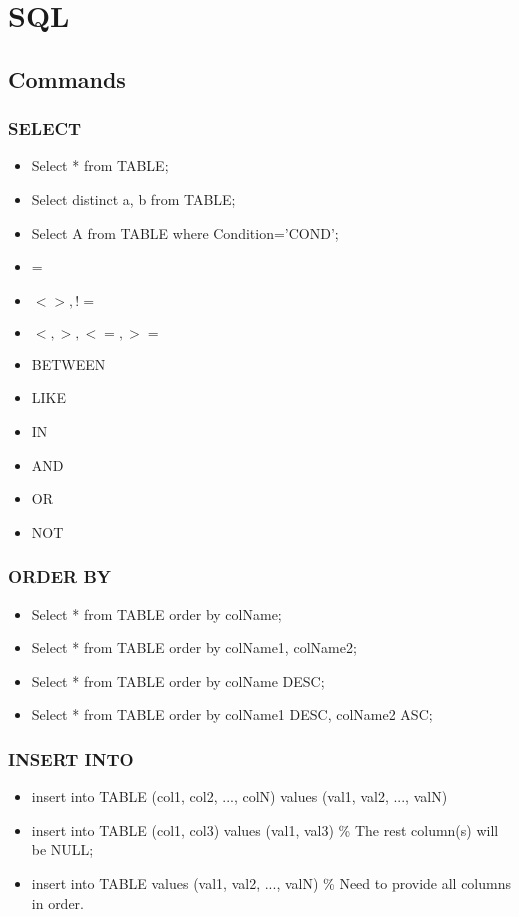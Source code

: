 \part{SQL}
	\chapter{Commands}
		\section{SELECT}
			\begin{itemize}
				\item Select * from TABLE;
				\item Select distinct a, b from TABLE;
				\item Select A from TABLE where Condition='COND';
			\end{itemize}

			\begin{itemize}
				\item =
				\item $<>, !=$
				\item $<, >, <=, >=$
				\item BETWEEN
				\item LIKE
				\item IN
			\end{itemize}

			\begin{itemize}
				\item AND
				\item OR
				\item NOT
			\end{itemize}

		\section{ORDER BY}
			\begin{itemize}
				\item Select * from TABLE order by colName;
				\item Select * from TABLE order by colName1, colName2;
				\item Select * from TABLE order by colName DESC; 
				\item Select * from TABLE order by colName1 DESC, colName2 ASC;
			\end{itemize}

		\section{INSERT INTO}
			\begin{itemize}
				\item insert into TABLE (col1, col2, ..., colN) values (val1, val2, ..., valN)
				\item insert into TABLE (col1, col3) values (val1, val3) \% The rest column(s) will be NULL;
				\item insert into TABLE values (val1, val2, ..., valN) \% Need to provide all columns in order.
			\end{itemize}

